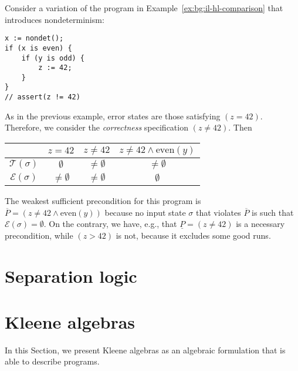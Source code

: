 \begin{example}\label{ex:nc-running}
	Consider a variation of the program in Example~\ref{ex:bg:il-hl-comparison} that introduces nondeterminism:
	\begin{verbatim}
x := nondet();
if (x is even) {
    if (y is odd) {
        z := 42;
    }
}
// assert(z != 42)
	\end{verbatim}
	As in the previous example, error states are those satisfying $(z = 42)$. Therefore, we consider the \emph{correctness} specification $(z \neq 42)$. Then
	\begin{center}
		\begin{tabular}{c|ccc}
			                      & $z = 42$         & $z \neq 42$      & $z \neq 42 \land \text{even}(y)$ \\
			\hline
			$\mathcal{T}(\sigma)$ & $\emptyset$      & $\neq \emptyset$ & $\neq \emptyset$                 \\
			$\mathcal{E}(\sigma)$ & $\neq \emptyset$ & $\neq \emptyset$ & $\emptyset$                      \\
		\end{tabular}
	\end{center}
	The weakest sufficient precondition for this program is $\overline{P} = (z\neq 42 \wedge \text{even}(y))$ because no input state $\sigma$ that violates $\overline{P}$ is such that $\mathcal{E}(\sigma) = \emptyset$.
	On the contrary, we have, e.g., that $\underline{P}= (z\neq 42)$ is a necessary precondition, while $(z > 42)$ is not, because it excludes some good runs.
\end{example}

\section{Separation logic}

\section{Kleene algebras}\label{sec:bg:algebra}
In this Section, we present Kleene algebras as an algebraic formulation that is able to describe programs.

